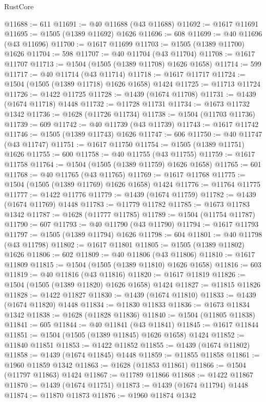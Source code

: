 \begin{lexlean}{RustCore}
\begin{coremodule}
@11688 := 611
@11691 := @40 @11688 (@43 @11688)
@11692 := @1617 @11691
@11695 := @1505 (@1389 @11692) @1626
@11696 := 608
@11699 := @40 @11696 (@43 @11696)
@11700 := @1617 @11699
@11703 := @1505 (@1389 @11700) @1626
@11704 := 598
@11707 := @40 @11704 (@43 @11704)
@11708 := @1617 @11707
@11713 := @1504 (@1505 (@1389 @11708) @1626 @1658)
@11714 := 599
@11717 := @40 @11714 (@43 @11714)
@11718 := @1617 @11717
@11724 := @1504 (@1505 (@1389 @11718) @1626 @1658) @1424
@11725 := @11713 @11724
@11726 := @1422 @11725
@11728 := @1439 (@1674 @11708)
@11731 := @1439 (@1674 @11718) @1448
@11732 := @11728 @11731
@11734 := @1673 @11732 @1342
@11736 := @1628 (@11726 @11734)
@11738 := @1504 (@11703 @11736)
@11739 := 609
@11742 := @40 @11739 (@43 @11739)
@11743 := @1617 @11742
@11746 := @1505 (@1389 @11743) @1626
@11747 := 606
@11750 := @40 @11747 (@43 @11747)
@11751 := @1617 @11750
@11754 := @1505 (@1389 @11751) @1626
@11755 := 600
@11758 := @40 @11755 (@43 @11755)
@11759 := @1617 @11758
@11764 := @1504 (@1505 (@1389 @11759) @1626 @1658)
@11765 := 601
@11768 := @40 @11765 (@43 @11765)
@11769 := @1617 @11768
@11775 := @1504 (@1505 (@1389 @11769) @1626 @1658) @1424
@11776 := @11764 @11775
@11777 := @1422 @11776
@11779 := @1439 (@1674 @11759)
@11782 := @1439 (@1674 @11769) @1448
@11783 := @11779 @11782
@11785 := @1673 @11783 @1342
@11787 := @1628 (@11777 @11785)
@11789 := @1504 (@11754 @11787)
@11790 := 607
@11793 := @40 @11790 (@43 @11790)
@11794 := @1617 @11793
@11797 := @1505 (@1389 @11794) @1626
@11798 := 604
@11801 := @40 @11798 (@43 @11798)
@11802 := @1617 @11801
@11805 := @1505 (@1389 @11802) @1626
@11806 := 602
@11809 := @40 @11806 (@43 @11806)
@11810 := @1617 @11809
@11815 := @1504 (@1505 (@1389 @11810) @1626 @1658)
@11816 := 603
@11819 := @40 @11816 (@43 @11816)
@11820 := @1617 @11819
@11826 := @1504 (@1505 (@1389 @11820) @1626 @1658) @1424
@11827 := @11815 @11826
@11828 := @1422 @11827
@11830 := @1439 (@1674 @11810)
@11833 := @1439 (@1674 @11820) @1448
@11834 := @11830 @11833
@11836 := @1673 @11834 @1342
@11838 := @1628 (@11828 @11836)
@11840 := @1504 (@11805 @11838)
@11841 := 605
@11844 := @40 @11841 (@43 @11841)
@11845 := @1617 @11844
@11851 := @1504 (@1505 (@1389 @11845) @1626 @1658) @1424
@11852 := @11840 @11851
@11853 := @1422 @11852
@11855 := @1439 (@1674 @11802)
@11858 := @1439 (@1674 @11845) @1448
@11859 := @11855 @11858
@11861 := @1960 @11859 @1342
@11863 := @1628 (@11853 @11861)
@11866 := @1504 (@11797 @11863) @1424
@11867 := @11789 @11866
@11868 := @1422 @11867
@11870 := @1439 (@1674 @11751)
@11873 := @1439 (@1674 @11794) @1448
@11874 := @11870 @11873
@11876 := @1960 @11874 @1342

\end{coremodule}
\end{lexlean}

